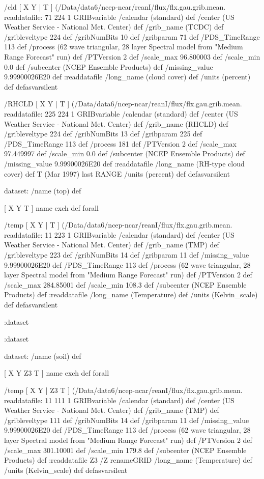 \begin{ingrid}
  /cld { [ X Y | T ] (/Data/data6/ncep-ncar/reanI/flux/flx.gau.grib.mean.%
  readdatafile:
  71 224 1 GRIBvariable
  /calendar (standard) def
  /center (US Weather Service - National Met. Center) def
  /grib_name (TCDC) def
  /gribleveltype 224 def
  /gribNumBits 10 def
  /gribparam 71 def
  /PDS_TimeRange 113 def
  /process (62 wave triangular, 28 layer Spectral model from "Medium Range Forecast" run) def
  /PTVersion 2 def
  /scale_max 96.800003 def
  /scale_min 0.0 def
  /subcenter (NCEP Ensemble Products) def
  /missing_value 9.99900026E20 def
  :readdatafile
  /long_name (cloud cover) def
  /units (percent) def
  } defasvarsilent

  /RHCLD { [ X Y | T ] (/Data/data6/ncep-ncar/reanI/flux/flx.gau.grib.mean.%
  readdatafile:
  225 224 1 GRIBvariable
  /calendar (standard) def
  /center (US Weather Service - National Met. Center) def
  /grib_name (RHCLD) def
  /gribleveltype 224 def
  /gribNumBits 13 def
  /gribparam 225 def
  /PDS_TimeRange 113 def
  /process 181 def
  /PTVersion 2 def
  /scale_max 97.449997 def
  /scale_min 0.0 def
  /subcenter (NCEP Ensemble Products) def
  /missing_value 9.99900026E20 def
  :readdatafile
  /long_name (RH-type cloud cover) def
  T (Mar 1997) last RANGE
  /units (percent) def
  } defasvarsilent

  dataset: /name (top) def

   [ X Y T ] { name exch def } forall

   /temp { [ X Y | T ] (/Data/data6/ncep-ncar/reanI/flux/flx.gau.grib.mean.%
   readdatafile:
   11 223 1 GRIBvariable
   /calendar (standard) def
   /center (US Weather Service - National Met. Center) def
   /grib_name (TMP) def
   /gribleveltype 223 def
   /gribNumBits 14 def
   /gribparam 11 def
   /missing_value 9.99900026E20 def
   /PDS_TimeRange 113 def
   /process (62 wave triangular, 28 layer Spectral model from "Medium Range Forecast" run) def
   /PTVersion 2 def
   /scale_max 284.85001 def
   /scale_min 108.3 def
   /subcenter (NCEP Ensemble Products) def
   :readdatafile
   /long_name (Temperature) def
   /units (Kelvin_scale) def
   } defasvarsilent

  :dataset

 :dataset

 dataset: /name (soil) def

  [ X Y Z3 T ] { name exch def } forall

  /temp { [ X Y | Z3 T ] (/Data/data6/ncep-ncar/reanI/flux/flx.gau.grib.mean.%
  readdatafile:
  11 111 1 GRIBvariable
  /calendar (standard) def
  /center (US Weather Service - National Met. Center) def
  /grib_name (TMP) def
  /gribleveltype 111 def
  /gribNumBits 14 def
  /gribparam 11 def
  /missing_value 9.99900026E20 def
  /PDS_TimeRange 113 def
  /process (62 wave triangular, 28 layer Spectral model from "Medium Range Forecast" run) def
  /PTVersion 2 def
  /scale_max 301.10001 def
  /scale_min 179.8 def
  /subcenter (NCEP Ensemble Products) def
  :readdatafile
  Z3 /Z renameGRID
  /long_name (Temperature) def
  /units (Kelvin_scale) def
  } defasvarsilent


\end{ingrid}
